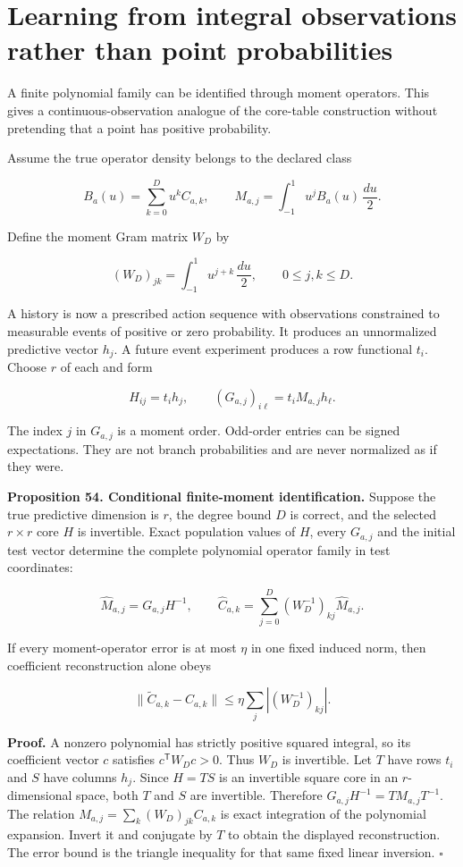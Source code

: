 \section{Learning from integral observations rather than point probabilities}\label{LSM:learning-from-integral-observations-rather-than-point-probabilities}

A finite polynomial family can be identified through moment operators.
This gives a continuous-observation analogue of the core-table
construction without pretending that a point has positive probability.

Assume the true operator density belongs to the declared class

\[
B_a(u)=\sum_{k=0}^D u^k C_{a,k},
\qquad
M_{a,j}=\int_{-1}^1 u^j B_a(u)\,\frac{du}{2}.
\]

Define the moment Gram matrix \(W_D\) by

\[
(W_D)_{jk}=\int_{-1}^1u^{j+k}\,\frac{du}{2},
\qquad 0\leq j,k\leq D.
\]

A history is now a prescribed action sequence with observations
constrained to measurable events of positive or zero probability. It
produces an unnormalized predictive vector \(h_j\). A future event
experiment produces a row functional \(t_i\). Choose \(r\) of each and
form

\[
H_{ij}=t_i h_j,\qquad
(G_{a,j})_{i\ell}=t_i M_{a,j}h_\ell.
\]

The index \(j\) in \(G_{a,j}\) is a moment order. Odd-order entries can
be signed expectations. They are not branch probabilities and are never
normalized as if they were.

\textbf{Proposition 54. Conditional finite-moment identification.}
Suppose the true predictive dimension is \(r\), the degree bound \(D\)
is correct, and the selected \(r\times r\) core \(H\) is invertible.
Exact population values of \(H\), every \(G_{a,j}\) and the initial test
vector determine the complete polynomial operator family in test
coordinates:

\[
\boxed{
\widehat M_{a,j}=G_{a,j}H^{-1},
\qquad
\widehat C_{a,k}=\sum_{j=0}^D(W_D^{-1})_{kj}\widehat M_{a,j}.
}
\]

If every moment-operator error is at most \(\eta\) in one fixed induced
norm, then coefficient reconstruction alone obeys

\[
\|\widetilde C_{a,k}-\widehat C_{a,k}\|
\leq\eta\sum_j|(W_D^{-1})_{kj}|.
\]

\textbf{Proof.} A nonzero polynomial has strictly positive squared
integral, so its coefficient vector \(c\) satisfies
\(c^{\mathsf T}W_Dc>0\). Thus \(W_D\) is invertible. Let \(T\) have rows
\(t_i\) and \(S\) have columns \(h_j\). Since \(H=TS\) is an invertible
square core in an \(r\)-dimensional space, both \(T\) and \(S\) are
invertible. Therefore \(G_{a,j}H^{-1}=TM_{a,j}T^{-1}\). The relation
\(M_{a,j}=\sum_k(W_D)_{jk}C_{a,k}\) is exact integration of the
polynomial expansion. Invert it and conjugate by \(T\) to obtain the
displayed reconstruction. The error bound is the triangle inequality for
that same fixed linear inversion. \(\square\)


